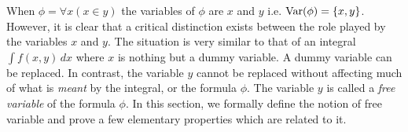 When $\phi=\forall x(x\in y)$ the variables of $\phi$ are $x$ and
$y$ i.e. $\mbox{\rm Var}(\phi)=\{x,y\}$. However, it is clear that a critical
distinction exists between the role played by the variables $x$ and
$y$. The situation is very similar to that of an integral $\int\!
f(x,y)\,dx$ where $x$ is nothing but a dummy variable. A dummy
variable can be replaced. In contrast, the variable $y$ cannot be
replaced without affecting much of what is {\em meant} by the
integral, or the formula $\phi$. The variable $y$ is called a {\em
free variable} of the formula $\phi$. In this section, we formally
define the notion of free variable and prove a few elementary
properties which are related to it.


